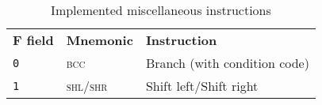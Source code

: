 \begin{table}[ht]
    \centering
    \begin{tabular}{|l l l|}
        \hline
        \textbf{F field} & \textbf{Mnemonic} & \textbf{Instruction} \\
        \texttt{0} & \textsc{bcc} & Branch (with condition code) \\
        \texttt{1} & \textsc{shl/shr} & Shift left/Shift right\\
        \hline
    \end{tabular}

    \caption{Implemented miscellaneous instructions}
    \label{tab:misc_instrs}
\end{table}
